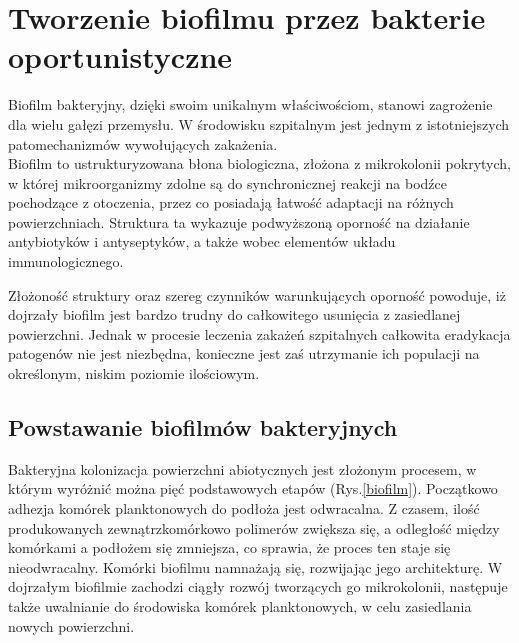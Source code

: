 \documentclass[11pt,a4paper]{report}
\begin{document}

\section{Tworzenie biofilmu przez bakterie oportunistyczne} 
Biofilm bakteryjny, dzięki swoim unikalnym właściwościom, stanowi zagrożenie dla wielu gałęzi przemysłu. W środowisku szpitalnym jest jednym z istotniejszych patomechanizmów wywołujących zakażenia\cite{zakszpit16}.\\

Biofilm to ustrukturyzowana błona biologiczna, złożona z mikrokolonii pokrytych, w której mikroorganizmy zdolne są do synchronicznej reakcji na bodźce pochodzące z otoczenia, przez co posiadają łatwość adaptacji na różnych powierzchniach. Struktura ta wykazuje podwyższoną oporność na działanie antybiotyków i antyseptyków, a także wobec elementów układu immunologicznego.
\clearpage

Złożoność struktury oraz szereg czynników warunkujących oporność powoduje, iż dojrzały biofilm jest bardzo trudny do całkowitego usunięcia z zasiedlanej powierzchni. Jednak w procesie leczenia zakażeń szpitalnych całkowita eradykacja patogenów nie jest niezbędna, konieczne jest zaś utrzymanie ich populacji na określonym, niskim poziomie ilościowym\cite{zakszpit16, czaczyk}.

\subsection{Powstawanie biofilmów bakteryjnych}
Bakteryjna kolonizacja powierzchni abiotycznych jest złożonym procesem, w którym wyróżnić można pięć podstawowych etapów (Rys.\ref{biofilm}). 
Początkowo adhezja komórek planktonowych do podłoża jest odwracalna. Z czasem, ilość produkowanych zewnątrzkomórkowo polimerów zwiększa się, a odległość między komórkami a podłożem się zmniejsza, co sprawia, że proces ten staje się nieodwracalny. Komórki biofilmu namnażają się, rozwijając jego architekturę. W dojrzałym biofilmie zachodzi ciągły rozwój tworzących go mikrokolonii, następuje także uwalnianie do środowiska komórek planktonowych, w celu zasiedlania nowych powierzchni\cite{czaczyk}.
\end{document}
